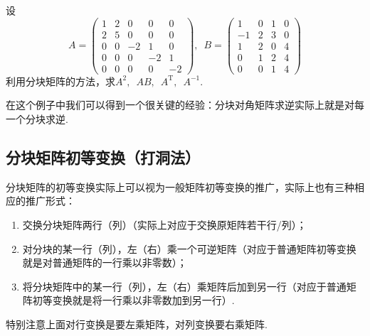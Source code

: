 \begin{example}
    设\[A=\begin{pmatrix}
        1 & 2 & 0 & 0 & 0 \\
        2 & 5 & 0 & 0 & 0 \\
        0 & 0 & -2 & 1 & 0 \\
        0 & 0 & 0 & -2 & 1 \\
        0 & 0 & 0 & 0 & -2
    \end{pmatrix},\enspace B=\begin{pmatrix}
        1 & 0 & 1 & 0 \\
        -1 & 2 & 3 & 0 \\
        1 & 2 & 0 & 4 \\
        0 & 1 & 2 & 4 \\
        0 & 0 & 1 & 4
    \end{pmatrix}\]
    利用分块矩阵的方法，求$A^2,\enspace AB,\enspace A^\mathrm{T},\enspace A^{-1}$.
\end{example}
\begin{solution}

\end{solution}

在这个例子中我们可以得到一个很关键的经验：分块对角矩阵求逆实际上就是对每一个分块求逆.

\subsection{分块矩阵初等变换（打洞法）}
分块矩阵的初等变换实际上可以视为一般矩阵初等变换的推广，实际上也有三种相应的推广形式：
\begin{enumerate}
    \item 交换分块矩阵两行（列）（实际上对应于交换原矩阵若干行/列）；
    \item 对分块的某一行（列），左（右）乘一个可逆矩阵（对应于普通矩阵初等变换就是对普通矩阵的一行乘以非零数）；
    \item 将分块矩阵中的某一行（列），左（右）乘矩阵后加到另一行（对应于普通矩阵初等变换就是将一行乘以非零数加到另一行）.
\end{enumerate}
特别注意上面对行变换是要左乘矩阵，对列变换要右乘矩阵.

